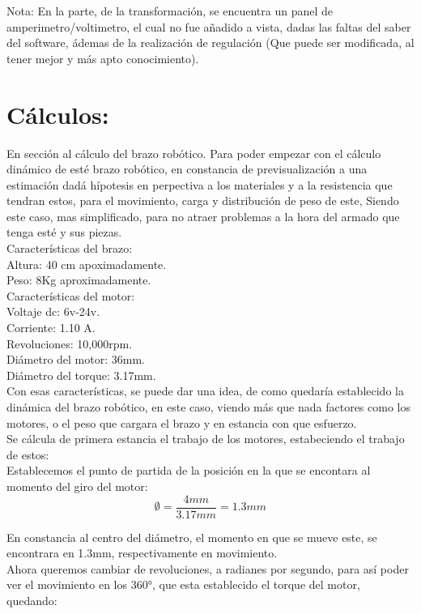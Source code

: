 \documentclass[14pt,a4paper]{article}
\begin{document}
Nota: En la parte, de la transformación, se encuentra un panel de amperimetro/voltimetro, el cual no fue añadido a vista, dadas las faltas del saber del software, ádemas de la realización de regulación (Que puede ser modificada, al tener mejor y más apto conocimiento).

\section{Cálculos:}
En sección al cálculo del brazo robótico. Para poder empezar con el cálculo dinámico de esté brazo robótico, en constancia de previsualización a una estimación dadá hípotesis en perpectiva a los materiales y a la resistencia que tendran estos, para el movimiento, carga y distribución de peso de este, Siendo este caso, mas simplificado, para no atraer problemas a la hora del armado que tenga esté y sus piezas.\\

Características del brazo:\\
Altura: 40 cm apoximadamente.\\
Peso: 8Kg aproximadamente.\\
Características del motor:\\
Voltaje dc: 6v-24v.\\
Corriente: 1.10 A.\\
Revoluciones: 10,000rpm.\\
Diámetro del motor: 36mm.\\
Diámetro del torque: 3.17mm.\\
Con esas características, se puede dar una idea, de como quedaría establecido la dinámica del brazo robótico, en este caso, viendo más que nada factores como los motores, o el peso que cargara el brazo y en estancia con que esfuerzo.\\
Se cálcula de primera estancia el trabajo de los motores, estabeciendo el trabajo de estos:\\

Establecemos el punto de partida de la posición en la que se encontara al momento del giro del motor:\\

$$ \emptyset=\frac{4mm}{3.17mm}= 1.3mm $$

En constancia al centro del diámetro, el momento en que se mueve este, se encontrara en 1.3mm, respectivamente en movimiento.\\
Ahora queremos cambiar de revoluciones, a radianes por segundo, para así poder ver el movimiento en los 360°, que esta establecido el torque del motor, quedando:\\
\end{document}
